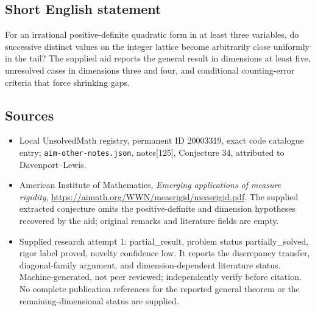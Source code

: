 \documentclass[11pt]{article}
\begin{document}
\subsection{Short English statement}
For an irrational positive-definite quadratic form in at least three variables, do successive distinct values on the integer lattice become arbitrarily close uniformly in the tail? The supplied aid reports the general result in dimensions at least five, unresolved cases in dimensions three and four, and conditional counting-error criteria that force shrinking gaps.
\subsection{Sources}
\begin{itemize}
\item Local UnsolvedMath registry, permanent ID 20003319, exact code catalogue entry; \texttt{aim-other-notes.json}, notes[125], Conjecture 34, attributed to Davenport--Lewis.
\item American Institute of Mathematics, \emph{Emerging applications of measure rigidity}, \url{https://aimath.org/WWN/measrigid/measrigid.pdf}. The supplied extracted conjecture omits the positive-definite and dimension hypotheses recovered by the aid; original remarks and literature fields are empty.
\item Supplied research attempt 1: partial\_result, problem status partially\_solved, rigor label proved, novelty confidence low. It reports the discrepancy transfer, diagonal-family argument, and dimension-dependent literature status. Machine-generated, not peer reviewed; independently verify before citation. No complete publication references for the reported general theorem or the remaining-dimensional status are supplied.
\end{itemize}
\end{document}
